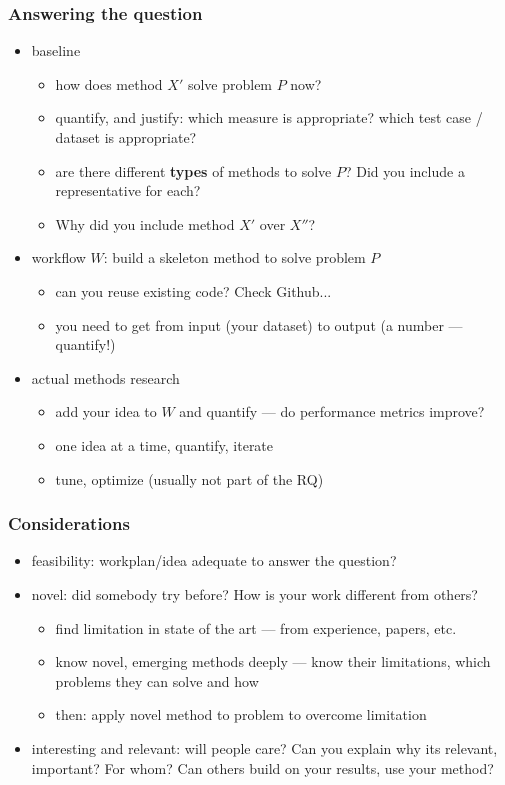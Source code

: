 \documentclass{beamer}
\begin{document}
\begin{frame}
  \frametitle{Answering the question}
  \begin{itemize}
  \item baseline
    \begin{itemize}
    \item how does method $X'$ solve problem $P$ now?
    \item quantify, and justify: which measure is appropriate? which
      test case / dataset is appropriate?
    \item are there different {\bf types} of methods to solve $P$? Did
      you include a representative for each?
    \item Why did you include method $X'$ over $X''$?
    \end{itemize}
    \pause
  \item workflow $W$: build a skeleton method to solve problem $P$
    \begin{itemize}
    \item can you reuse existing code? Check Github...
    \item you need to get from input (your dataset) to output (a
      number --- quantify!)
    \end{itemize}
    \pause
  \item actual methods research
    \begin{itemize}
    \item add your idea to $W$ and quantify --- do performance metrics
      improve?
    \item one idea at a time, quantify, iterate
    \item tune, optimize (usually not part of the RQ)
    \end{itemize}
  \end{itemize}
\end{frame}

\begin{frame}
  \frametitle{Considerations}
  \begin{itemize}
  \item feasibility: workplan/idea adequate to answer the question?
  \item novel: did somebody try before? How is your work different
    from others?
    \begin{itemize}
    \item find limitation in state of the art --- from experience,
      papers, etc.
    \item know novel, emerging methods deeply --- know their
      limitations, which problems they can solve and how
    \item then: apply novel method to problem to overcome limitation
    \end{itemize}
  \item interesting and relevant: will people care? Can you explain
    why its relevant, important? For whom? Can others build on your
    results, use your method?
  \end{itemize}
\end{frame}
\end{document}
